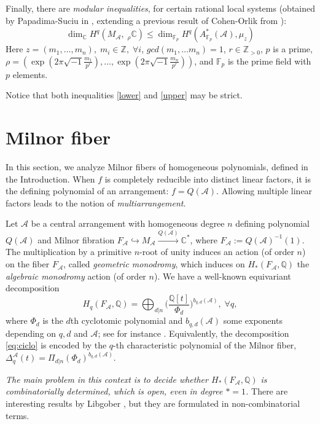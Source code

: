 \documentclass[psamsfonts]{conm-p-l}
\theoremstyle{definition}
\theoremstyle{remark}
\numberwithin{equation}{section}
\newcommand{\A}{{\mathcal A}}
\newcommand{\Z}{\mathbb{Z}}
\newcommand{\Q}{\mathbb{Q}}
\newcommand{\C}{\mathbb{C}}
\newcommand{\F}{\mathbb{F}}
\begin{document}
Finally, there are {\em modular inequalities}, for certain rational local systems 
(obtained by Papadima-Suciu in \cite{PS2},
extending a previous result of Cohen-Orlik from \cite{CO}):
%
\begin{equation}
\label{upper}
\dim_{\C}H^q(M_{\A},\; _\rho\C) \leq \dim _{\F_p}H^q(A^*_{\F_p}(\A), \mu_{z})
\end{equation}
Here $z=(m_1, \dots, m_n), \; m_i \in \Z, \;\forall i$, 
$gcd(m_1, \dots m_n)=1$, $r \in \Z_{>0}$, $p$ is a prime,
$\rho=(\exp(2 \pi \sqrt{-1}\frac{m_1}{p^r}), \dots, \exp(2 \pi \sqrt{-1}\frac{m_n}{p^r}))$,
and $\F_p$ is the prime field with $p$ elements.

Notice that both inequalities \eqref{lower} and \eqref{upper} may be strict.

\section{Milnor fiber}
\label{sect:Milnor}

In this section, we analyze Milnor fibers of homogeneous polynomials, defined in the
Introduction. When $f$ is completely reducible into distinct linear factors, 
it is the defining polynomial of an arrangement: $f=Q(\A)$. Allowing 
multiple linear factors leads to the notion of {\em multiarrangement}.

Let $\A$ be a central arrangement with homogeneous degree $n$ defining polynomial  $Q({\A})$ 
and Milnor fibration $F_{\A}\hookrightarrow M_{\A}
\stackrel{Q({\A})}{\rightarrow}\C^*$, where $F_{\A}:=Q({\A})^{-1}(1)$.
The multiplication by a primitive $n$-root of unity induces an action (of order $n$)
on the fiber $F_{\A}$, called {\it geometric monodromy}, which induces  on 
$H_*(F_{\A}, \Q)$ the {\em algebraic monodromy} action (of order $n$). We have 
a well-known equivariant decomposition 
%
\begin{equation}
\label{eq:ciclo}
H_q(F_{\A}, \Q)= \bigoplus_{d |n} \big( \frac{\Q[t]}{\Phi_d} \big)^{b_{q,d}(\A)},\;\forall q,
\end{equation}
where $\Phi_d$ is the $d$th cyclotomic polynomial and $b_{q,d}(\A)$ some exponents depending on $q, d$ and $\A$; see for instance
\cite{OT, L}. Equivalently, the decomposition \eqref{eq:ciclo} is encoded by
the $q$-th characteristic polynomial of the Milnor fiber, 
$\Delta_q^{\A}(t)=\Pi_{d|n}(\Phi_d)^{b_{q,d}(\A)}$.

{\it The main problem in this context is to decide whether $H_*(F_{\A}, \Q)$ is
combinatorially determined, which is open, even in degree $*=1$.} There are
interesting results by Libgober \cite{L83, LM}, but they are formulated in
non-combinatorial terms. 
\end{document}
